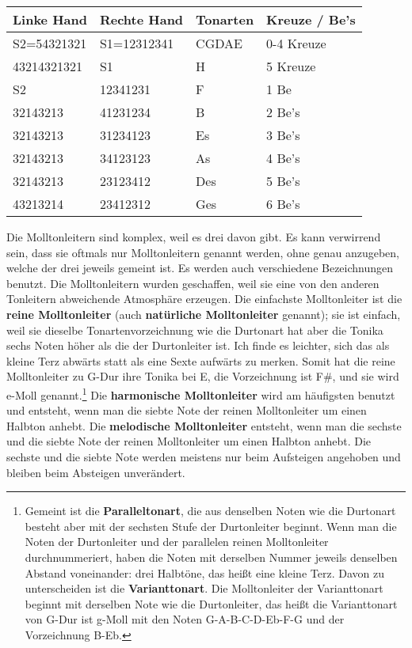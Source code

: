 \begin{tabular}{l|l|l|l}
 \textbf{Linke Hand} & \textbf{Rechte Hand} & \textbf{Tonarten} & \textbf{Kreuze / Be's} \\ 
 \hline
 S2=54321321 & S1=12312341 & CGDAE & 0-4 Kreuze \\ 
 43214321321 & S1 & H & 5 Kreuze \\
 S2 & 12341231 & F & 1 Be \\
 32143213 & 41231234 & B & 2 Be's \\
 32143213 & 31234123 & Es & 3 Be's \\ 
 32143213 & 34123123 & As & 4 Be's \\
 32143213 & 23123412 & Des & 5 Be's \\
 43213214 & 23412312 & Ges & 6 Be's \\
\end{tabular}

\hypertarget{tablemoll}{}

Die Molltonleitern sind komplex, weil es drei davon gibt.
Es kann verwirrend sein, dass sie oftmals nur Molltonleitern genannt werden, ohne genau anzugeben, welche der drei jeweils gemeint ist.
Es werden auch verschiedene Bezeichnungen benutzt.
Die Molltonleitern wurden geschaffen, weil sie eine von den anderen Tonleitern abweichende Atmosphäre erzeugen.
Die einfachste Molltonleiter ist die \textbf{reine Molltonleiter} (auch \textbf{natürliche Molltonleiter} genannt); sie ist einfach, weil sie dieselbe Tonartenvorzeichnung wie die Durtonart hat aber die Tonika sechs Noten höher als die der Durtonleiter ist.
Ich finde es leichter, sich das als kleine Terz abwärts statt als eine Sexte aufwärts zu merken. 
Somit hat die reine Molltonleiter zu G-Dur ihre Tonika bei E, die Vorzeichnung ist F\#, und sie wird e-Moll genannt.\footnote{Gemeint ist die \textbf{Paralleltonart}, die aus denselben Noten wie die Durtonart besteht aber mit der sechsten Stufe der Durtonleiter beginnt. Wenn man die Noten der Durtonleiter und der parallelen reinen Molltonleiter durchnummeriert, haben die Noten mit derselben Nummer jeweils denselben Abstand voneinander: drei Halbtöne, das heißt eine kleine Terz. Davon zu unterscheiden ist die \textbf{Varianttonart}. Die Molltonleiter der Varianttonart beginnt mit derselben Note wie die Durtonleiter, das heißt die Varianttonart von G-Dur ist g-Moll mit den Noten G-A-B-C-D-Eb-F-G und der Vorzeichnung B-Eb.}
Die \textbf{harmonische  Molltonleiter} wird am häufigsten benutzt und entsteht, wenn man die siebte Note der reinen Molltonleiter um einen Halbton anhebt.
Die \textbf{melodische  Molltonleiter} entsteht, wenn man die sechste und die siebte Note der reinen Molltonleiter um einen Halbton anhebt.
Die sechste und die siebte Note werden meistens nur beim Aufsteigen angehoben und bleiben beim Absteigen unverändert.

